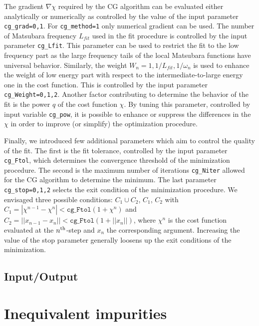 \documentclass[final,3p,10pt]{elsarticle}
\begin{document}
The gradient $\nabla\chi$ required by the CG algorithm can be
evaluated either analytically or numerically as
controlled by the value of the input parameter \texttt{cg\_grad=0,1}. For
\texttt{cg\_method=1} only numerical gradient can be used.
The number of Matsubara frequency $L_{fit}$ used in the fit procedure
is controlled  by the input parameter \texttt{cg\_Lfit}.
This parameter can be used to restrict the fit to the low frequency
part as the large frequency tails of the local Matsubara functions
have universal behavior.
Similarly, the weight  $W_n=1,1/L_{fit},1/\omega_n$ is used to
enhance the weight of low energy part with respect to the
intermediate-to-large energy one in the cost function.
This is controlled by the input parameter \texttt{cg\_Weight=0,1,2}.
Another  factor contributing to determine the behavior
of the fit is the power $q$ of the cost function $\chi$. By tuning
this parameter, controlled by input variable \texttt{cg\_pow}, it is
possible to enhance or suppress the differences in the $\chi$ in order
to improve (or simplify) the optimization procedure.  

Finally, we introduced few additional parameters which aim to
control the quality of the fit. The first is the fit tolerance,
controlled by the input parameter \texttt{cg\_Ftol}, which
determines the convergence threshold of the minimization procedure.
The second is the maximum number of iterations \texttt{cg\_Niter}
allowed for the CG algorithm to determine the minimum.
The last parameter \texttt{cg\_stop=0,1,2} selects the exit
condition of the minimization procedure. We envisaged  three
possible conditions: $C_1\cup C_2$, $C_1$, $C_2$ with 
$C_1=|\chi^{n-1} -\chi^n|<\mathtt{cg\_Ftol}(1+\chi^n)$ and
$C_2=||x_{n-1} -x_n||<\mathtt{cg\_Ftol}(1+||x_n||)$, where $\chi^n$
is the cost function evaluated at the $n^{\rm th}$-step and $x_n$
the corresponding argument. Increasing the value of the stop
parameter generally loosens up the exit conditions of the minimization.   



\subsection{Input/Output}\label{sSecIO}




\section{Inequivalent impurities}
\end{document}
